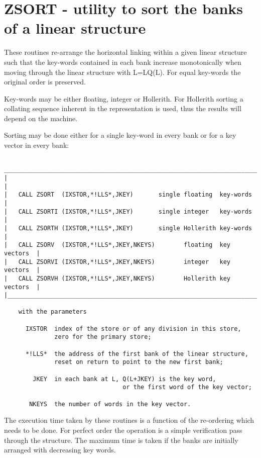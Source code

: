 \section{ZSORT  - utility to sort the banks of a linear structure}

These routines re-arrange the horizontal linking
within a given linear structure such that the key-words contained in
each bank increase monotonically when moving through the linear
structure with L=LQ(L).
For equal key-words the original order is preserved.

Key-words may be either floating, integer or Hollerith.
For Hollerith sorting a collating sequence
inherent in the representation is used,
thus the results will depend on the machine.

Sorting may be done either for a single key-word in every bank
or for a key vector in every bank:

\begin{verbatim}
 ________________________________________________________________________
|                                                                        |
|   CALL ZSORT  (IXSTOR,*!LLS*,JKEY)       single floating  key-words    |
|   CALL ZSORTI (IXSTOR,*!LLS*,JKEY)       single integer   key-words    |
|   CALL ZSORTH (IXSTOR,*!LLS*,JKEY)       single Hollerith key-words    |
|   CALL ZSORV  (IXSTOR,*!LLS*,JKEY,NKEYS)        floating  key vectors  |
|   CALL ZSORVI (IXSTOR,*!LLS*,JKEY,NKEYS)        integer   key vectors  |
|   CALL ZSORVH (IXSTOR,*!LLS*,JKEY,NKEYS)        Hollerith key vectors  |
|________________________________________________________________________|

    with the parameters

      IXSTOR  index of the store or of any division in this store,
              zero for the primary store;

      *!LLS*  the address of the first bank of the linear structure,
              reset on return to point to the new first bank;

        JKEY  in each bank at L, Q(L+JKEY) is the key word,
                                 or the first word of the key vector;

       NKEYS  the number of words in the key vector.
\end{verbatim}

The execution time taken by these routines is a function
of the re-ordering which needs to be done.
For perfect order the operation is a simple verification pass
through the structure.
The maximum time is taken if the banks are initially arranged with
decreasing key words.

